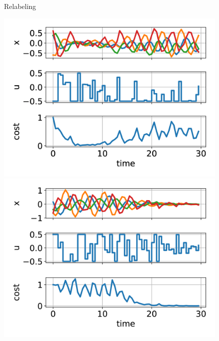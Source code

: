 \documentclass[
  letterpaper,
  DIV=11,
  numbers=noendperiod,
  oneside]{scrartcl}
\begin{document}
\begin{figure}
\newline
\begin{minipage}{0.33\linewidth}
\\
\strut \\
Relabeling\end{minipage}%
%
\begin{minipage}{0.33\linewidth}
\includegraphics{figs/masses-HER-badmodel.gif}\end{minipage}%
%
\begin{minipage}{0.33\linewidth}
\includegraphics{figs/masses-HER-goodmodel.gif}\end{minipage}%

\end{figure}%
\end{document}
